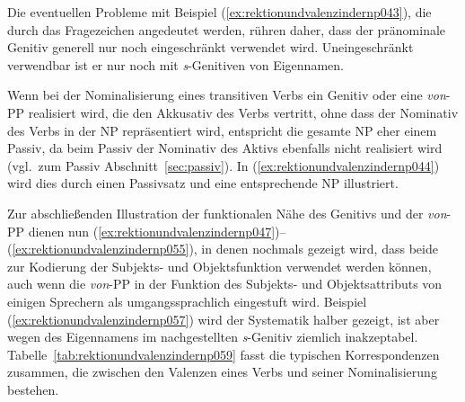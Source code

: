 \begin{exe}
  \ex\label{ex:rektionundvalenzindernp039}
  \begin{xlist}
  \end{xlist}
\end{exe}

Die eventuellen Probleme mit Beispiel (\ref{ex:rektionundvalenzindernp043}), die durch das Fragezeichen angedeutet werden, rühren daher, dass der pränominale Genitiv generell nur noch eingeschränkt verwendet wird.
Uneingeschränkt verwendbar ist er nur noch mit \textit{s}-Genitiven von Eigennamen.

Wenn bei der Nominalisierung eines transitiven Verbs ein Genitiv oder eine \textit{von}-PP realisiert wird, die den Akkusativ des Verbs vertritt, ohne dass der Nominativ des Verbs in der NP repräsentiert wird, entspricht die gesamte NP eher einem Passiv, da beim Passiv der Nominativ des Aktivs ebenfalls nicht realisiert wird (vgl.\ zum Passiv Abschnitt~\ref{sec:passiv}).
In (\ref{ex:rektionundvalenzindernp044}) wird dies durch einen Passivsatz und eine entsprechende NP illustriert.

\begin{exe}
  \ex\label{ex:rektionundvalenzindernp044}
  \begin{xlist}
  \end{xlist}
\end{exe}

Zur abschließenden Illustration der funktionalen Nähe des Genitivs und der \textit{von}-PP dienen nun (\ref{ex:rektionundvalenzindernp047})--(\ref{ex:rektionundvalenzindernp055}), in denen nochmals gezeigt wird, dass beide zur Kodierung der Subjekts- und Objektsfunktion verwendet werden können, auch wenn die \textit{von}-PP in der Funktion des Subjekts- und Objektsattributs von einigen Sprechern als umgangssprachlich eingestuft wird.
Beispiel (\ref{ex:rektionundvalenzindernp057}) wird der Systematik halber gezeigt, ist aber wegen des Eigennamens im nachgestellten \textit{s}-Genitiv ziemlich inakzeptabel.
Tabelle~\ref{tab:rektionundvalenzindernp059} fasst die typischen Korrespondenzen zusammen, die zwischen den Valenzen eines Verbs und seiner Nominalisierung bestehen.

